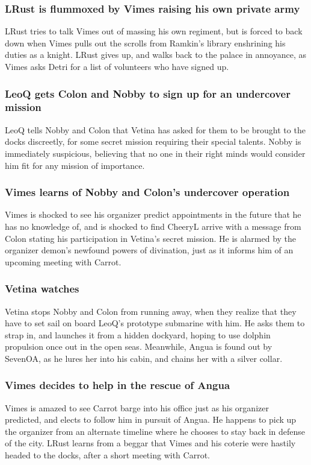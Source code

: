 \subsubsection{\Gls{LRust} is flummoxed by \Gls{Vimes} raising his own private army}
\Gls{LRust} tries to talk \Gls{Vimes} out of massing his own regiment, but is forced to back down
when \Gls{Vimes} pulls out the scrolls from \Gls{Ramkin}'s library enshrining his duties as a
knight. \Gls{LRust} gives up, and walks back to the palace in annoyance, as \Gls{Vimes} asks
\Gls{Detri} for a list of volunteers who have signed up.

\subsubsection{\Gls{LeoQ} gets \Gls{Colon} and \Gls{Nobby} to sign up for an undercover mission}
\Gls{LeoQ} tells \Gls{Nobby} and \Gls{Colon} that \Gls{Vetina} has asked for them to be brought to
the docks discreetly, for some secret mission requiring their special talents. \Gls{Nobby} is
immediately suspicious, believing that no one in their right minds would consider him fit for any
mission of importance.

\subsubsection{\Gls{Vimes} learns of \Gls{Nobby} and \Gls{Colon}'s undercover operation}
\Gls{Vimes} is shocked to see his organizer predict appointments in the future that he has no
knowledge of, and is shocked to find \Gls{CheeryL} arrive with a message from \Gls{Colon} stating
his participation in \Gls{Vetina}'s secret mission. He is alarmed by the organizer demon's newfound
powers of divination, just as it informs him of an upcoming meeting with \Gls{Carrot}.

\subsubsection{\Gls{Vetina} watches }
\Gls{Vetina} stops \Gls{Nobby} and \Gls{Colon} from running away, when they realize that they have
to set sail on board \Gls{LeoQ}'s prototype submarine with him. He asks them to strap in, and
launches it from a hidden dockyard, hoping to use dolphin propulsion once out in the open seas.
Meanwhile, \Gls{Angua} is found out by \Gls{SevenOA}, as he lures her into his cabin, and chains her
with a silver collar.

\subsubsection{\Gls{Vimes} decides to help in the rescue of \Gls{Angua}}
\Gls{Vimes} is amazed to see \Gls{Carrot} barge into his office just as his organizer predicted,
and elects to follow him in pursuit of \Gls{Angua}. He happens to pick up the organizer from an
alternate timeline where he chooses to stay back in defense of the city. \Gls{LRust} learns from a
beggar that \Gls{Vimes} and his coterie were hastily headed to the docks, after a short meeting
with \Gls{Carrot}.


